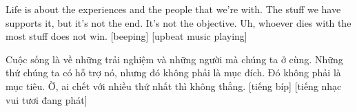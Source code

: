 \documentclass[a4paper]{article}
\begin{document}
	
	Life is about the experiences and the people that we're with.
	The stuff we have supports it, but it's not the end.
	It's not the objective.
	Uh, whoever dies with the most stuff does not win.
	[beeping]
	[upbeat music playing]
	
	\begin{vietnamese-v2}
		Cuộc sống là về những trải nghiệm và những người mà chúng ta ở cùng.
		Những thứ chúng ta có hỗ trợ nó, nhưng đó không phải là mục đích.
		Đó không phải là mục tiêu.
		Ờ, ai chết với nhiều thứ nhất thì không thắng.
		[tiếng bíp]
		[tiếng nhạc vui tươi đang phát]
	\end{vietnamese-v2}

	
\end{document}
